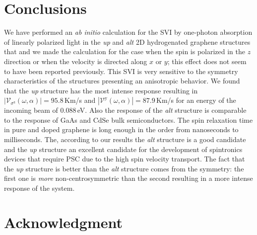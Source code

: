 \documentclass[prb,11pt,tightenlines,twocolumn,aps]{revtex4-1}
\begin{document}



\section{Conclusions} %
\label{sec:conclusions}

We have performed an \emph{ab initio} calculation for the SVI by one-photon
absorption of linearly polarized light in the \emph{up} and \emph{alt} 2D
hydrogenated graphene structures that and we made the calculation for the case
when the spin is polarized in the $z$ direction or when the velocity is
directed along $x$ or $y$; this effect does not seem to have been reported
previously. 
% 
This SVI is very sensitive to the symmetry characteristics of the structures
presenting an anisotropic behavior. We found that the \emph{up} structure has
the most intense response resulting in $|\mathcal{V}_{\sigma^{\mathrm{z}}}
(\omega,\alpha)| = 95.8$\,Km/s and $|\mathcal{V}^{\mathrm{y}} (\omega,\alpha)|
= 87.9$\,Km/s for an energy of the incoming beam of 0.088\,eV. Also the
response of the \emph{alt} structure is comparable to the response of GaAs and
CdSe bulk semiconductors.
% 
The spin relaxation time in pure and doped graphene is long enough in the order
from nanoseconds to milliseconds. \cite{wojtaszekPRB13,ertlerPRB09} The,
according to our results the \emph{alt} structure is a good candidate and the
\emph{up} structure an excellent candidate for the development of spintronics
devices that require PSC due to the high spin velocity transport. The fact that
the \emph{up} structure is better than the \emph{alt} structure comes from the
symmetry: the first one is \emph{more} non-centrosymmetric than
the second resulting in a more intense response of the system. 

\section{Acknowledgment} %
\end{document}
